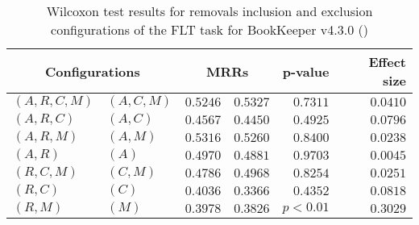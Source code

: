 
\begin{table}
\begin{spacing}{1.2}
\centering
\caption{Wilcoxon test results for removals inclusion and exclusion configurations of the FLT task for BookKeeper v4.3.0 (\ctwo)}
\label{table:versus-wilcox-bookkeeper-flt-removals}
\begin{tabular}{ll|rr|rr}
\toprule
      \multicolumn{2}{c|}{Configurations} &                \multicolumn{2}{c|}{MRRs} &             p-value & Effect size \\
\midrule
 $(A,R,C,M)$ &  $(A,C,M)$ &       $0.5246$ &  $\bm{0.5327}$ & $0.7311$ &    $0.0410$ \\
   $(A,R,C)$ &    $(A,C)$ &  $\bm{0.4567}$ &       $0.4450$ & $0.4925$ &    $0.0796$ \\
   $(A,R,M)$ &    $(A,M)$ &  $\bm{0.5316}$ &       $0.5260$ & $0.8400$ &    $0.0238$ \\
     $(A,R)$ &      $(A)$ &  $\bm{0.4970}$ &       $0.4881$ & $0.9703$ &    $0.0045$ \\
   $(R,C,M)$ &    $(C,M)$ &       $0.4786$ &  $\bm{0.4968}$ & $0.8254$ &    $0.0251$ \\
     $(R,C)$ &      $(C)$ &  $\bm{0.4036}$ &       $0.3366$ & $0.4352$ &    $0.0818$ \\
     $(R,M)$ &      $(M)$ &  $\bm{0.3978}$ &       $0.3826$ & $p<0.01$ &    $0.3029$ \\
\bottomrule
\end{tabular}

\end{spacing}
\end{table}

